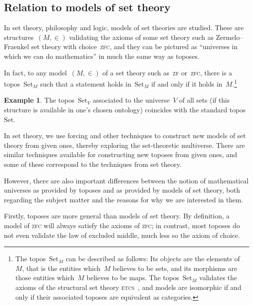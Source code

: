 \documentclass[oneside,reqno]{amsart}
\theoremstyle{definition}
\newtheorem{ex}[defn]{Example}
\theoremstyle{plain}
\theoremstyle{remark}
\newcommand{\Set}{\mathrm{Set}}
\renewcommand{\_}{\mathpunct{.}\,}
\newcommand{\?}{\,{:}\,}
\begin{document}


\subsection{Relation to models of set theory} In set theory, philosophy and
logic, models of set theories are studied. These are structures~$(M,\in)$
validating the axioms of some set theory such as Zermelo--Fraenkel set theory
with choice~\textsc{zfc}, and they can be pictured as ``universes in which we
can do mathematics'' in much the same way as toposes.

In fact, to any model~$(M,\in)$ of a set theory such as~\textsc{zf}
or~\textsc{zfc}, there is a topos~$\Set_M$ such that a statement holds
in~$\Set_M$ if and only if it holds in~$M$.\footnote{The topos~$\Set_M$ can be
described as follows: Its objects are the elements of~$M$, that is the entities
which~$M$ believes to be sets, and its morphisms are those entities which~$M$
believes to be maps. The topos~$\Set_M$ validates the axioms of the structural
set theory \textsc{etcs}~\cite{XXX}, and models are isomorphic if and only if their
associated toposes are equivalent as categories.}

\begin{ex}The topos~$\Set_V$ associated to the universe~$V$ of all sets (if
this structure is available in one's chosen ontology) coincides with the
standard topos~$\Set$.\end{ex}

In set theory, we use forcing and other techniques to construct new
models of set theory from given ones, thereby exploring the set-theoretic
multiverse. There are similar techniques available for constructing new toposes
from given ones, and some of these correspond to the techniques from set
theory.

However, there are also important differences between the notion of mathematical
universes as provided by toposes and as provided by models of set theory, both
regarding the subject matter and the reasons for why we are interested in them.

Firstly, toposes are more general than models of set theory. By definition, a
model of \textsc{zfc} will always satisfy the axioms of \textsc{zfc}; in
contrast, most toposes do not even validate the law of excluded middle, much
less so the axiom of choice.
\end{document}
